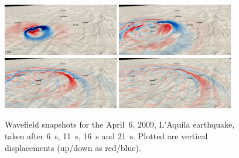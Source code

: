 \documentclass[referee,extra]{gji}
\begin{document}
\begin{figure}
\begin{center}
\includegraphics[width=0.45\textwidth]{./images/aquila_1d_7000source-1.jpg}
\includegraphics[width=0.45\textwidth]{./images/aquila_1d_7000source-2.jpg}
\includegraphics[width=0.45\textwidth]{./images/aquila_1d_7000source-3.jpg}
\includegraphics[width=0.45\textwidth]{./images/aquila_1d_7000source-4.jpg}
\end{center}
\caption{Wavefield snapshots for the April~6, 2009, L'Aquila earthquake,
taken after 6~s, 11~s, 16~s and 21~s.
Plotted are vertical displacements (up/down as red/blue).
}
\label{figure:aquila}
\end{figure}
\end{document}
